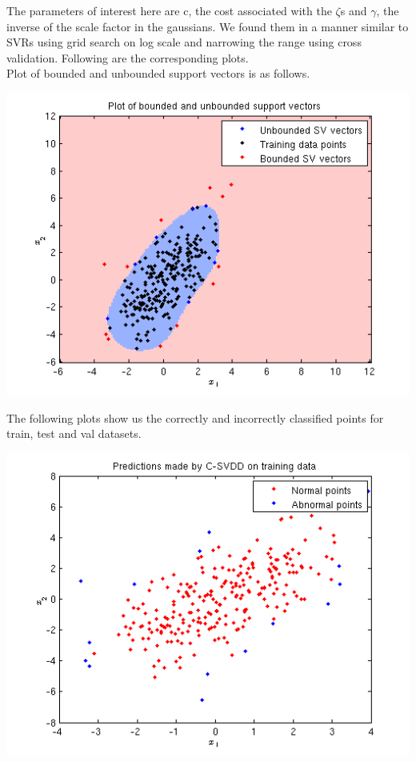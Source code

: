 \documentclass{article}
\begin{document}
The parameters of interest here are c, the cost associated with the $\zeta$s and $\gamma$, the inverse of the scale factor in the gaussians. We found them in a manner similar to SVRs using grid search on log scale and narrowing the range using cross validation. Following are the corresponding plots. \\[10pt]
Plot of bounded and unbounded support vectors is as follows.
\begin{center}
\includegraphics[scale=1]{SVDD/c/SV}
\end{center}
The following plots show us the correctly and incorrectly classified points for train, test and val datasets.
\begin{center}
\includegraphics[scale=.8]{SVDD/c/train_plot}
\end{center}
\end{document}
